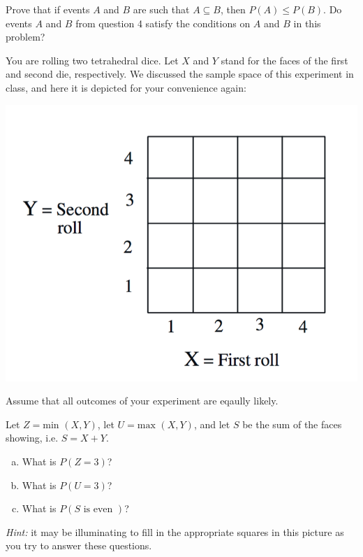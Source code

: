 \documentclass[12pt]{article}
\newenvironment{question}[2][Question]{\begin{trivlist}
\item[\hskip \labelsep {\bfseries #1}\hskip \labelsep {\bfseries #2.}]}{\end{trivlist}}
\begin{document}
\vspace{5mm}

 \begin{question}{6} Prove that if events $A$ and $B$ are such that $A \subseteq B$, then $P(A) \leq P(B)$. Do events $A$ and $B$ from question 4 satisfy the conditions on $A$ and $B$ in this problem? 
 \end{question} 
 
\vspace{5mm}
 \begin{question}{7} You are rolling two tetrahedral dice. Let $X$ and $Y$ stand for the faces of the first and second die, respectively. 
We discussed the sample space of this experiment in class, and here it is depicted for your convenience again:
\begin{center}
 \includegraphics[scale=0.30]{TetraDie}
 \end{center}

Assume that all outcomes of your experiment are eqaully likely. 
\vspace{3mm}

Let $Z = \text{min }(X, Y)$, let  $ U = \text{max }(X, Y)$, and let $S$ be the sum of the faces showing, i.e. $S = X + Y$.

\begin{enumerate}[(a)]
 \item What is $P(Z = 3)$?
\item What is $P(U = 3)$?
 \item What is $P(S \text{ is even })$?
 \end{enumerate}
  \textit{Hint:} it may be illuminating to fill in the appropriate squares in this picture as you try to answer these questions.
 \end{question} 
\end{document}
